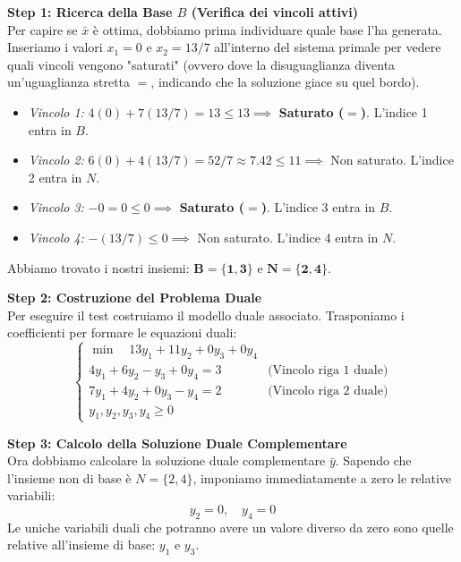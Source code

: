 \documentclass[12pt, a4paper]{article}
\begin{document}
	\vspace{0.3cm}
	\textbf{Step 1: Ricerca della Base $B$ (Verifica dei vincoli attivi)}\\
	Per capire se $\bar{x}$ è ottima, dobbiamo prima individuare quale base l'ha generata. Inseriamo i valori $x_1 = 0$ e $x_2 = 13/7$ all'interno del sistema primale per vedere quali vincoli vengono "saturati" (ovvero dove la disuguaglianza diventa un'uguaglianza stretta $=$, indicando che la soluzione giace su quel bordo).
	
	\begin{itemize}[label=$\circ$, itemsep=2pt, leftmargin=1.5cm]
		\item \textit{Vincolo 1:} $4(0) + 7(13/7) = 13 \leq 13 \implies$ \textbf{Saturato ($=$)}. L'indice 1 entra in $B$.
		\item \textit{Vincolo 2:} $6(0) + 4(13/7) = 52/7 \approx 7.42 \leq 11 \implies$ Non saturato. L'indice 2 entra in $N$.
		\item \textit{Vincolo 3:} $-0 = 0 \leq 0 \implies$ \textbf{Saturato ($=$)}. L'indice 3 entra in $B$.
		\item \textit{Vincolo 4:} $-(13/7) \leq 0 \implies$ Non saturato. L'indice 4 entra in $N$.
	\end{itemize}
	Abbiamo trovato i nostri insiemi: $\mathbf{B = \{1, 3\}}$ e $\mathbf{N = \{2, 4\}}$.
	
	\vspace{0.3cm}
	\textbf{Step 2: Costruzione del Problema Duale}\\
	Per eseguire il test costruiamo il modello duale associato. Trasponiamo i coefficienti per formare le equazioni duali:
	\[
	\begin{cases}
		\min \quad 13y_1 + 11y_2 + 0y_3 + 0y_4 \\[6pt]
		4y_1 + 6y_2 - y_3 + 0y_4 = 3 \quad &\text{(Vincolo riga 1 duale)} \\
		7y_1 + 4y_2 + 0y_3 - y_4 = 2 \quad &\text{(Vincolo riga 2 duale)} \\[6pt]
		y_1, y_2, y_3, y_4 \geq 0
	\end{cases}
	\]
	
	\vspace{0.3cm}
	\textbf{Step 3: Calcolo della Soluzione Duale Complementare}\\
	Ora dobbiamo calcolare la soluzione duale complementare $\bar{y}$. Sapendo che l'insieme non di base è $N = \{2, 4\}$, imponiamo immediatamente a zero le relative variabili:
	\[
	y_2 = 0, \quad y_4 = 0
	\]
	Le uniche variabili duali che potranno avere un valore diverso da zero sono quelle relative all'insieme di base: $y_1$ e $y_3$. 
	
\end{document}
